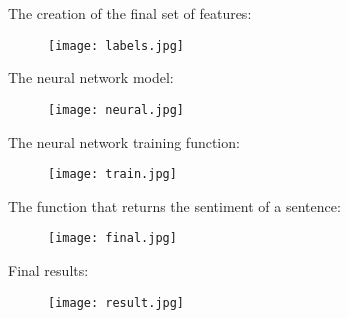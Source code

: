 \documentclass[a4paper,10pt]{report}
\begin{document}
The creation of the final set of features:\\

\begin{figure}[H]
 \centering
  \texttt{[image: labels.jpg]}
 \end{figure}

The neural network model:\\

\begin{figure}[H]
 \centering
  \texttt{[image: neural.jpg]}
 \end{figure}

The neural network training function:\\

\begin{figure}[H]
 \centering
  \texttt{[image: train.jpg]}
 \end{figure}

The function that returns the sentiment of a sentence:\\

\begin{figure}[H]
 \centering
  \texttt{[image: final.jpg]}
 \end{figure}

Final results:\\

\begin{figure}[H]
 \centering
  \texttt{[image: result.jpg]}
 \end{figure}
\end{document}

